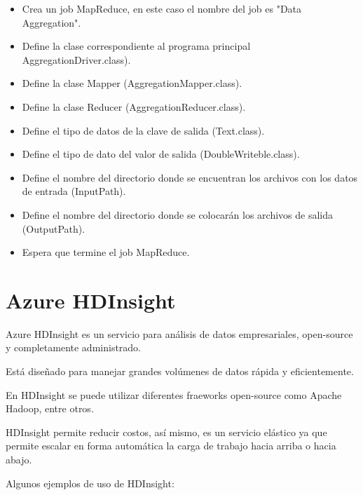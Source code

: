 \begin{itemize}
\item Crea un job MapReduce, en este caso el nombre del job es "Data Aggregation".
\item Define la clase correspondiente al programa principal AggregationDriver.class).
\item Define la clase Mapper (AggregationMapper.class).
\item Define la clase Reducer (AggregationReducer.class).
\item Define el tipo de datos de la clave de salida (Text.class).
\item Define el tipo de dato del valor de salida (DoubleWriteble.class).
\item Define el nombre del directorio donde se encuentran los archivos con los datos de entrada (InputPath).
\item Define el nombre del directorio donde se colocarán los archivos de salida (OutputPath).
\item Espera que termine el job MapReduce.
\end{itemize}

\section{Azure HDInsight}

Azure HDInsight es un servicio para análisis de datos empresariales, open-source y completamente administrado.

Está diseñado para manejar grandes volúmenes de datos rápida y eficientemente.

En HDInsight se puede utilizar diferentes fraeworks open-source como Apache Hadoop, entre otros.

HDInsight permite reducir costos, así mismo, es un servicio elástico ya que permite escalar en forma automática la carga de trabajo hacia arriba o hacia abajo.

Algunos ejemplos de uso de HDInsight:

